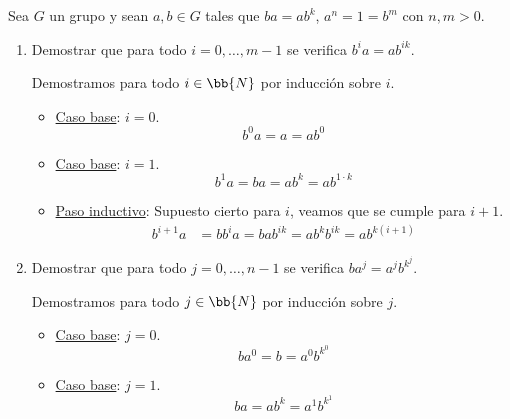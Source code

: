 \begin{ejercicio}\label{ej:2.13}
    Sea $G$ un grupo y sean $a, b \in G$ tales que $ba = ab^k$, $a^n = 1 = b^m$ con $n, m> 0$.
    \begin{enumerate}
        \item Demostrar que para todo $i = 0, \ldots, m - 1$ se verifica $b^ia = ab^{ik}$.
        
        Demostramos para todo $i\in \bb{N}$ por inducción sobre $i$.
        \begin{itemize}
            \item  \ul{Caso base}: $i = 0$.
            \begin{equation*}
                b^0a = a = ab^0
            \end{equation*}

            \item \ul{Caso base}: $i = 1$.
            \begin{equation*}
                b^1a = ba = ab^k = ab^{1\cdot k}
            \end{equation*}

            \item \ul{Paso inductivo}: Supuesto cierto para $i$, veamos que se cumple para $i+1$.
            \begin{align*}
                b^{i+1}a
                &= bb^ia = bab^{ik} = ab^kb^{ik} = ab^{k(i+1)}
            \end{align*}
        \end{itemize}
        \item Demostrar que para todo $j = 0, \ldots, n - 1$ se verifica $ba^j = a^jb^{k^j}$.
        
        Demostramos para todo $j\in \bb{N}$ por inducción sobre $j$.
        \begin{itemize}
            \item  \ul{Caso base}: $j = 0$.
            \begin{equation*}
                ba^0 = b = a^0b^{k^0}
            \end{equation*}

            \item \ul{Caso base}: $j = 1$.
            \begin{equation*}
                ba = ab^k = a^1b^{k^1}
            \end{equation*}


\end{itemize}
\end{enumerate}
\end{ejercicio}
